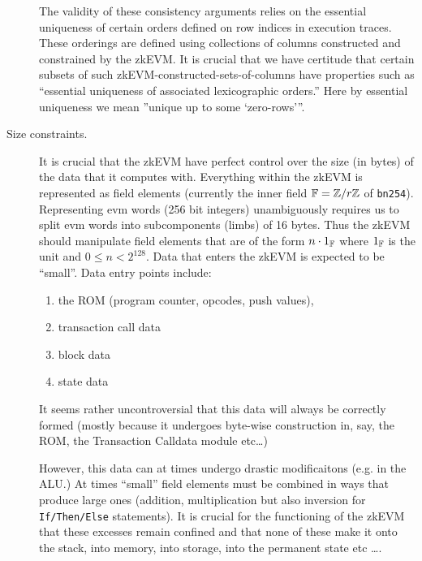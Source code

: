 \documentclass{article}
\begin{document}
\begin{description}
	The validity of these consistency arguments relies on the essential uniqueness of certain orders defined on row indices in execution traces. These orderings are defined using collections of columns constructed and constrained by the zkEVM. It is crucial that we have certitude that certain subsets of such zkEVM-constructed-sets-of-columns have properties such as ``essential uniqueness of associated lexicographic orders.'' Here by essential uniqueness we mean ''unique up to some `zero-rows'''.
	\item[Size constraints.] It is crucial that the zkEVM have perfect control over the size (in bytes) of the data that it computes with. Everything within the zkEVM is represented as field elements (currently the inner field $\Bbb{F} = \Bbb{Z} / r\Bbb{Z}$ of \texttt{bn254}). Representing evm words (256 bit integers) unambiguously requires us to split evm words into subcomponents (limbs) of 16 bytes. Thus the zkEVM should manipulate field elements that are of the form $n\cdot 1_\Bbb{F}$ where $1_\Bbb{F}$ is the unit and $0\leq n < 2^{128}$. Data that enters the zkEVM is expected to be ``small''. Data entry points include:
	\begin{enumerate}
		\item the ROM (program counter, opcodes, push values),
		\item transaction call data
		\item block data
		\item state data
	\end{enumerate}
	It seems rather uncontroversial that this data will always be correctly formed (mostly because it undergoes byte-wise construction in, say, the ROM, the Transaction Calldata module etc\dots{})

	However, this data can at times undergo drastic modificaitons (e.g. in the ALU.) At times ``small'' field elements must be combined in ways that produce large ones (addition, multiplication but also inversion for \texttt{If/Then/Else} statements). It is crucial for the functioning of the zkEVM that these excesses remain confined and that none of these make it onto the stack, into memory, into storage, into the permanent state etc \dots{}.


\end{description}
\end{document}

